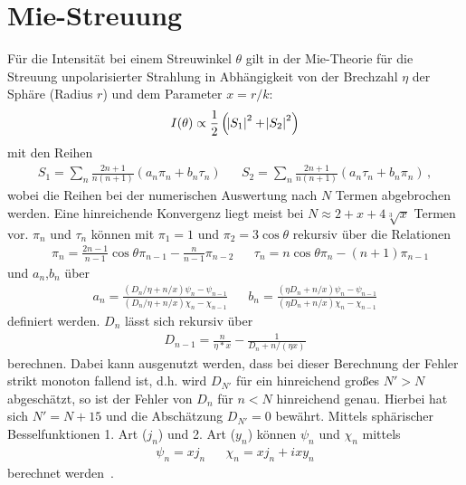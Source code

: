 \chapter{Mie-Streuung}
\label{app:mie}
Für die Intensität bei einem Streuwinkel $\theta$ gilt in der Mie-Theorie für die Streuung unpolarisierter Strahlung in Abhängigkeit von der Brechzahl $\eta$ der Sphäre (Radius $r$) und dem Parameter $x=r/k$:
\begin{equation}
	I(\theta)\propto\frac{1}{2}\left(\abs{S_1}^2+\abs{S_2}^2\right)
\end{equation} 
mit den Reihen
\begin{align}
	S_1=\sum_n{\frac{2n+1}{n(n+1)}(a_n\pi_n+b_n\tau_n)} &   & S_2=\sum_n{\frac{2n+1}{n(n+1)}(a_n\tau_n+b_n\pi_n)}\,, 
\end{align}
wobei die Reihen bei der numerischen Auswertung nach $N$ Termen abgebrochen werden. Eine hinreichende Konvergenz liegt meist bei $N\approx2+x+4\sqrt[3]{x}$ Termen vor.  $\pi_n$ und $\tau_n$ können mit $\pi_1=1$ und  $\pi_2=3\cos{\theta}$ rekursiv über die Relationen
\begin{align}
	  & \pi_n=\frac{2n-1}{n-1}\cos{\theta}\pi_{n-1}-\frac{n}{n-1}\pi_{n-2} &   & \tau_n=n\cos{\theta}\pi_n-(n+1)\pi_{n-1}
\end{align}
und $a_n$,$b_n$ über 
\begin{align}
	a_n=\frac{(D_n/\eta+n/x)\psi_n-\psi_{n-1}}{(D_n/\eta+n/x)\chi_n-\chi_{n-1}} &   &   
	b_n=\frac{(\eta D_n+n/x)\psi_n-\psi_{n-1}}{(\eta D_n+n/x)\chi_n-\chi_{n-1}}
\end{align} definiert werden. $D_n$ lässt sich rekursiv über
\begin{align}
	D_{n-1}=\frac{n}{\eta*x}-\frac{1}{D_n+n/(\eta x)} 
\end{align} 
berechnen. Dabei kann ausgenutzt werden, dass bei dieser Berechnung der Fehler strikt monoton fallend ist, d.h. wird $D_{N'}$ für ein hinreichend großes $N'>N$ abgeschätzt, so ist der Fehler von $D_n$ für $n<N$ hinreichend genau. Hierbei hat sich $N'=N+15$ und die Abschätzung $D_{N'}=0$ bewährt. Mittels sphärischer Besselfunktionen 1. Art ($j_n$) und 2. Art ($y_n$) können $\psi_n$ und $\chi_n$ mittels
\begin{align}
	\psi_n=x j_n &   & \chi_n=x j_n+ixy_n 
\end{align}
berechnet werden~\cite{bohren1983,maetzler2002}.

